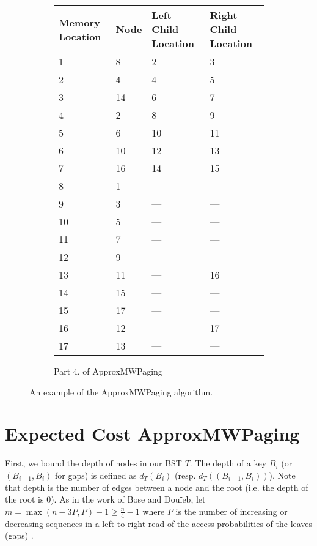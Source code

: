 \documentclass[letterpaper,12pt,titlepage,oneside,final]{book}
\theoremstyle{plain}
\begin{document}
\begin{figure}[H]
\begin{center}
\begin{subfigure}[b]{0.72\textwidth}
\begin{center}
    \begin{tabular}{ | l | l | l | p{5cm} |}
    \hline
    Memory Location & Node & Left Child Location & Right Child Location \\ \hline
    1  & 8  & 2    & 3    \\ \hline
    2  & 4  & 4    & 5    \\ \hline
    3  & 14 & 6    & 7    \\ \hline
    4  & 2  & 8    & 9    \\ \hline
    5  & 6  & 10   & 11   \\ \hline
    6  & 10 & 12   & 13   \\ \hline
    7  & 16 & 14   & 15   \\ \hline
    8  & 1  & --- & --- \\ \hline
    9  & 3  & --- & --- \\ \hline
    10 & 5  & --- & --- \\ \hline
    11 & 7  & --- & --- \\ \hline
    12 & 9  & --- & --- \\ \hline
    13 & 11 & --- & 16   \\ \hline
    14 & 15 & --- & --- \\ \hline
    15 & 17 & --- & --- \\ \hline
    16 & 12 & --- & 17   \\ \hline
    17 & 13 & --- & --- \\ \hline
    \end{tabular}
\end{center}

\caption{Part 4. of ApproxMWPaging}
\end{subfigure}
\end{center}


\caption{An example of the ApproxMWPaging algorithm.}
\end{figure}


\section{Expected Cost ApproxMWPaging} \label{45}

First, we bound the depth of nodes in our BST $T$. The depth of a key $B_i$ (or $(B_{i-1}, B_i)$ for gaps) is defined as $d_T(B_i)$ (resp. $d_T((B_{i-1},B_i))$). Note that depth is the number of edges between a node and the root (i.e. the depth of the root is $0$). As in the work of Bose and Dou\"{i}eb, let $m=\max({n-3P,P})-1 \geq \frac{n}{4} - 1$ where $P$ is the number of increasing or decreasing sequences in a left-to-right read of the access probabilities of the leaves (gaps) \cite{bose2009efficient}.
\end{document}
